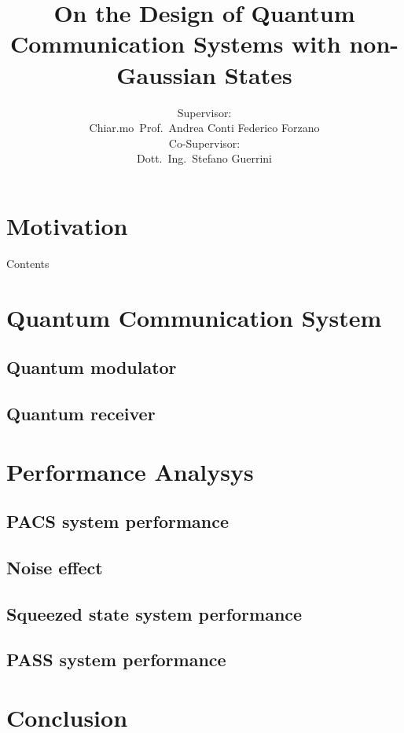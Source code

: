 \documentclass{beamer}
\author[Federico Forzano]{
                        {\scriptsize Supervisor:}\hspace{60mm}{\scriptsize Candidate:}\\
                        Chiar.mo~Prof.~Andrea Conti \hspace{25mm} Federico Forzano\\
                        {\scriptsize Co-Supervisor:}\\
                        Dott.~Ing.~Stefano Guerrini
                        }
\title{On the Design of Quantum Communication Systems with non-Gaussian States}
\date{}
\begin{document}
        
    
    


    \section{Motivation}
    
    \begin{frame}{Contents}
        \tableofcontents
    \end{frame}

    \section{Quantum Communication System}
    
    \subsection{Quantum modulator}
    
    
    \subsection{Quantum receiver}
    

    \section{Performance Analysys}
    \subsection{PACS system performance}
    
    \subsection{Noise effect}
    
    \subsection{Squeezed state system performance}
    
    \subsection{PASS system performance}
    

    \section{Conclusion}
    
\end{document}
